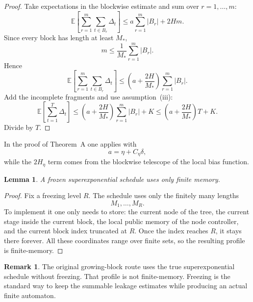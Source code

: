 \documentclass[12pt]{article}
\newtheorem{lemma}[theorem]{Lemma}
\theoremstyle{definition}
\newtheorem{remark}[theorem]{Remark}
\newcommand{\E}{\mathbb{E}}
\newcommand{\1}{\mathbf{1}}
\begin{document}
\begin{proof}
Take expectations in the blockwise estimate and sum over \(r=1,\dots,m\):
\[
\E\!\left[\sum_{r=1}^m\sum_{t\in B_r}\Delta_t\right]
\le
a\sum_{r=1}^m |B_r| + 2Hm.
\]
Since every block has length at least \(M_*\),
\[
m\le \frac{1}{M_*}\sum_{r=1}^m |B_r|.
\]
Hence
\[
\E\!\left[\sum_{r=1}^m\sum_{t\in B_r}\Delta_t\right]
\le
\left(a+\frac{2H}{M_*}\right)\sum_{r=1}^m |B_r|.
\]
Add the incomplete fragments and use assumption~(iii):
\[
\E\!\left[\sum_{t=1}^T\Delta_t\right]
\le
\left(a+\frac{2H}{M_*}\right)\sum_{r=1}^m |B_r| + K
\le
\left(a+\frac{2H}{M_*}\right)T + K.
\]
Divide by \(T\).
\end{proof}

In the proof of Theorem~A one applies  with
\[
a=\eta+C_\eta\delta,
\]
while the \(2H_\eta\) term comes from the blockwise telescope of the local bias function.

\begin{lemma}
\label{lem:frozen-memory}
A frozen superexponential schedule uses only finite memory.
\end{lemma}

\begin{proof}
Fix a freezing level \(R\).  The schedule uses only the finitely many lengths
\[
M_1,\dots,M_R.
\]
To implement it one only needs to store: the current node of the tree, the current stage
inside the current block, the local public memory of the node controller, and the current
block index truncated at \(R\).  Once the index reaches \(R\), it stays there forever.
All these coordinates range over finite sets, so the resulting profile is finite-memory.
\end{proof}

\begin{remark}
The original growing-block route uses the true superexponential schedule without freezing.
That profile is not finite-memory.  Freezing is the standard way to keep the summable
leakage estimates while producing an actual finite automaton.
\end{remark}
\end{document}
